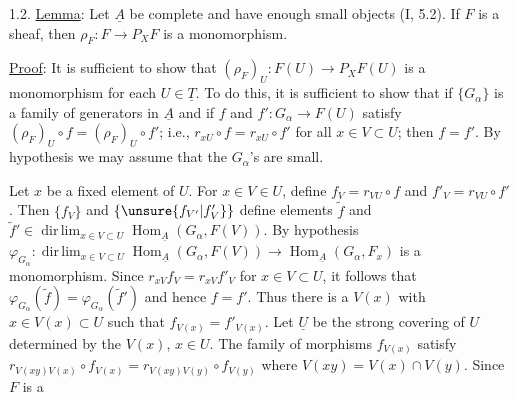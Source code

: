 
1.2. \uline{Lemma}: Let $\underline{A}$ be complete and have enough small objects
(I, 5.2). If $F$ is a sheaf, then $\rho_F:F\longrightarrow P_XF$ is a
monomorphism.

\uline{Proof}: It is sufficient to show that $(\rho_F)_U:F(U)\longrightarrow P_XF(U)$ is
a monomorphism for each $U\in\underline{T}$. To do this, it is sufficient to
show that if $\{G_\alpha\}$ is a family of generators in $\underline{A}$ and if $f$
and $f':G_\alpha\longrightarrow F(U)$ satisfy $(\rho_F)_U\circ f=(\rho_F)_U\circ f'$; i.e.,
$r_{xU}\circ f=r_{xU}\circ f'$ for all $x\in V\subset U$; then $f=f'$. By
hypothesis we may assume that the $G_\alpha$'s are small.

Let $x$ be a fixed element of $U$. For $x\in V\in U$, define
$f_V=r_{VU}\circ f$ and $f'_V=r_{VU}\circ f'$. Then $\{f_V\}$ and $\{\unsure{f_{V'}|f'_V}\}$
define elements $\tilde{f}$ and $\tilde{f}'\in\operatorname*{dir\,lim}_{x\in V\subset U}\operatorname{Hom}_{\underline{A}}(G_\alpha,F(V))$. By
hypothesis $\varphi_{G_\alpha}:\operatorname*{dir\,lim}_{x\in V\subset U}\operatorname{Hom}_{\underline{A}}(G_\alpha,F(V))\longrightarrow\operatorname{Hom}_{\underline{A}}(G_\alpha,F_x)$ is
a monomorphism. Since $r_{xV}f_V=r_{xV}f'_V$ for $x\in V\subset U$, it
follows that $\varphi_{G_\alpha}(\tilde{f})=\varphi_{G_\alpha}(\tilde{f}')$ and hence $f=f'$. Thus there
is a $V(x)$ with $x\in V(x)\subset U$ such that $f_{V(x)}=f'_{V(x)}$. Let
$\underline{U}$ be the strong covering of $U$ determined by the $V(x)$, $x\in U$.
The family of morphisms $f_{V(x)}$ satisfy $r_{V(xy)V(x)}\circ f_{V(x)}=
r_{V(xy)V(y)}\circ f_{V(y)}$ where $V(xy)=V(x)\cap V(y)$. Since $F$ is a
